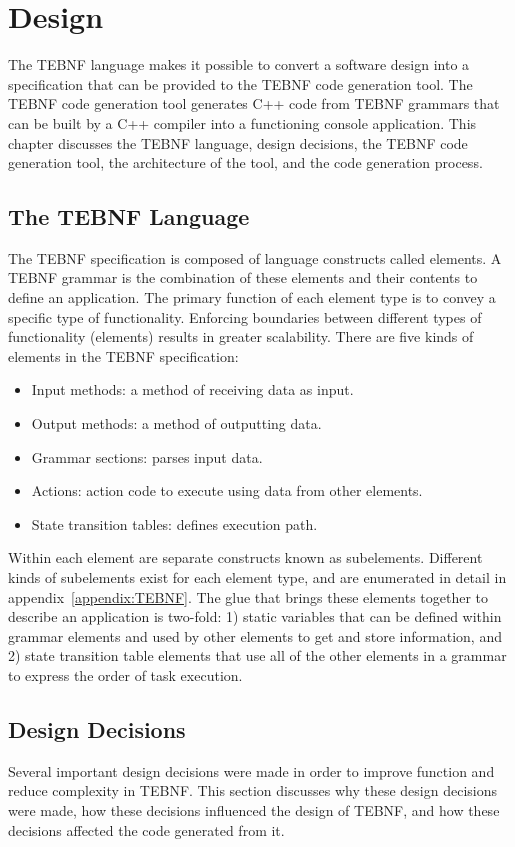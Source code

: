 \chapter{Design}
\label{chapters:Design}
The TEBNF language makes it possible to convert a software design into a specification that can be provided to the TEBNF code generation tool.  The TEBNF code generation tool generates C++ code from TEBNF grammars that can be built by a C++ compiler into a functioning console application.  This chapter discusses the TEBNF language, design decisions, the TEBNF code generation tool, the architecture of the tool, and the code generation process.

\section{The TEBNF Language}
The TEBNF specification is composed of language constructs called elements.  A TEBNF grammar is the combination of these elements and their contents to define an application.   The primary function of each element type is to convey a specific type of functionality.  Enforcing boundaries between different types of functionality (elements) results in greater scalability.  There are five kinds of elements in the TEBNF specification:
\begin{itemize}
  \item Input methods: a method of receiving data as input.
  \item Output methods: a method of outputting data.
  \item Grammar sections: parses input data. 
  \item Actions: action code to execute using data from other elements.
  \item State transition tables: defines execution path.
\end{itemize}

\indent
Within each element are separate constructs known as subelements.  Different kinds of subelements exist for each element type, and are enumerated in detail in appendix~\ref{appendix:TEBNF}.  The glue that brings these elements together to describe an application is two-fold: 1) static variables that can be defined within grammar elements and used by other elements to get and store information, and 2) state transition table elements that use all of the other elements in a grammar to express the order of task execution.

\section{Design Decisions}
Several important design decisions were made in order to improve function and reduce complexity in TEBNF.  This section discusses why these design decisions were made, how these decisions influenced the design of TEBNF, and how these decisions affected the code generated from it.

